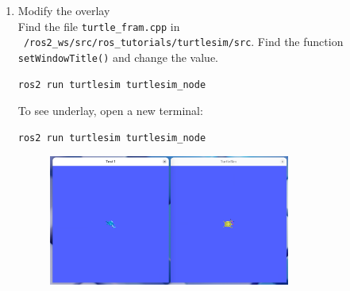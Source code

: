 \documentclass[12pt, a4paper]{article}
\begin{document}
\begin{enumerate}
\newpage
\item Modify the overlay\\
Find the file \texttt{turtle\_fram.cpp} in \\\texttt{~/ros2\_ws/src/ros\_tutorials/turtlesim/src}. Find the function \texttt{setWindowTitle()} and change the value.
\begin{lstlisting}[language=bash]
ros2 run turtlesim turtlesim_node
\end{lstlisting}
To see underlay, open a new terminal:
\begin{lstlisting}[language=bash]
ros2 run turtlesim turtlesim_node
\end{lstlisting}
\begin{figure}[h]
	\centering
	\includegraphics[width=0.75\textwidth]{2/p2.2-2}
\end{figure}
\end{enumerate}

\newpage
\end{document}
